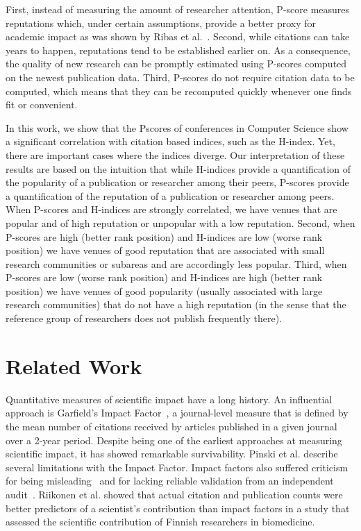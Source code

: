 \documentclass[notitlepage]{svjour3}
\begin{document}
First, instead of measuring the amount of researcher attention, P-score measures reputations
which, under certain assumptions, provide a better proxy for academic impact as was shown by 
Ribas et al.~\cite{Ribas2015a}. Second, while citations can take years to happen, reputations 
tend to be established earlier on. As a consequence, the quality of new research can be 
promptly estimated using P-scores computed on the newest publication data. Third, P-scores do
not require citation data to be computed, which means that they can be recomputed quickly whenever 
one finds fit or convenient.

In this work, we show that the Pscores of conferences in Computer Science show a significant 
correlation with citation based indices, such as the H-index. Yet, there are important cases where 
the indices diverge. 
Our interpretation of these results are based on the intuition that while H-indices provide a 
quantification of the popularity of a publication or researcher among their peers, P-scores 
provide a quantification of the reputation of a publication or researcher among peers. When
P-scores and H-indices are strongly correlated, we have venues that are popular and of high
reputation or unpopular with a low reputation. Second, when P-scores are high (better rank position) 
and H-indices are low (worse rank position) we have venues of good reputation
that are associated with small research communities or subareas and are accordingly less popular. Third, when P-scores
are low (worse rank position) and H-indices are high (better rank position) we have venues of good popularity 
(usually associated with large research communities) that do not have
a high reputation (in the sense that the reference group of researchers does not publish frequently there).

\section{Related Work}\label{sec:related-work}

Quantitative measures of scientific impact have a long history. An influential approach is
Garfield's Impact Factor~\cite{Garfield1955a}, a journal-level measure that is defined
by the mean number of citations received by articles published in a given journal over a 2-year period. 
Despite being one of the earliest approaches at measuring scientific impact, it has showed remarkable 
survivability. 
Pinski et al. \cite{Pinski1976} describe several limitations with the Impact Factor. Impact factors also suffered 
criticism for being misleading~\cite{Nature2016,Saha2003} and for lacking reliable validation from an independent 
audit~\cite{Rossner2007}. Riikonen et al. \cite{Riikonen2008} showed that actual citation 
and publication counts were better predictors of a scientist's contribution than impact factors in a 
study that assessed the scientific contribution of Finnish researchers in biomedicine.
\end{document}
